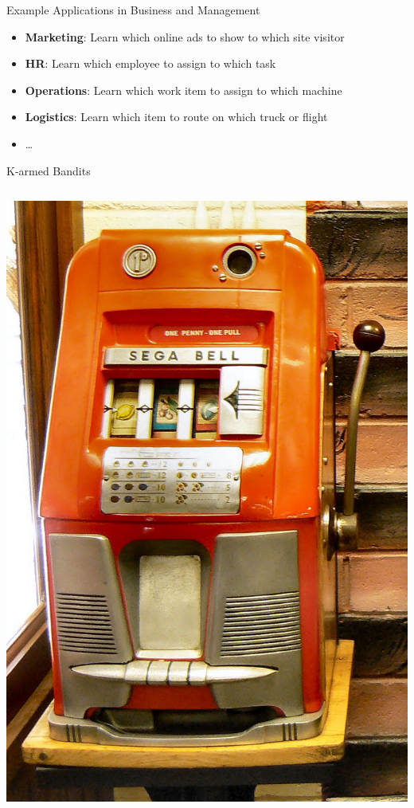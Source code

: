 \documentclass[ignorenonframetext,xcolor=x11names]{beamer}
\begin{document}
\begin{frame}{Example Applications in Business and Management}
\begin{itemize}
  \item \textbf{Marketing}: Learn which online ads to show to which site visitor
  \item \textbf{HR}: Learn which employee to assign to which task
  \item \textbf{Operations}: Learn which work item to assign to which machine
  \item \textbf{Logistics}: Learn which item to route on which truck or flight
  \item \ldots
\end{itemize}
\end{frame}

\begin{frame}{K-armed Bandits}
\begin{columns}
\begin{column}{.2\textwidth}
\includegraphics[width=1.2\textwidth]{one-armed_bandit.jpg}\\

\end{column}
\end{columns}
\end{frame}
\end{document}

